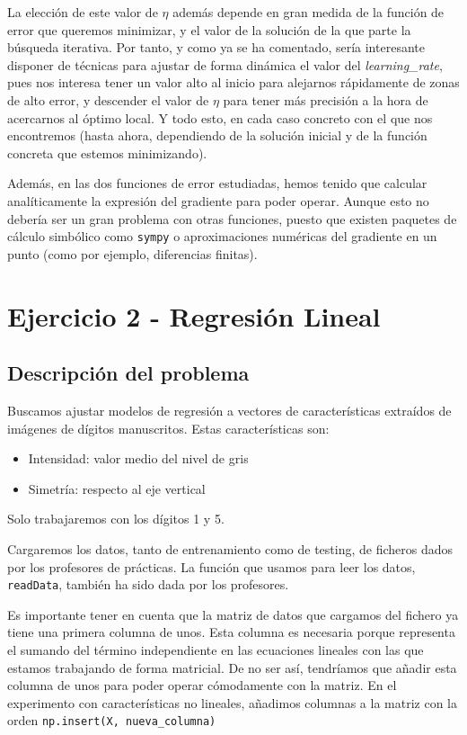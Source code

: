 \documentclass[11pt]{article}
\begin{document}
La elección de este valor de $\eta$ además depende en gran medida de la función de error que queremos minimizar, y el valor de la solución de la que parte la búsqueda iterativa. Por tanto, y como ya se ha comentado, sería interesante disponer de técnicas para ajustar de forma dinámica el valor del \emph{learning\_rate}, pues nos interesa tener un valor alto al inicio para alejarnos rápidamente de zonas de alto error, y descender el valor de $\eta$ para tener más precisión a la hora de acercarnos al óptimo local. Y todo esto, en cada caso concreto con el que nos encontremos (hasta ahora, dependiendo de la solución inicial y de la función concreta que estemos minimizando).

Además, en las dos funciones de error estudiadas, hemos tenido que calcular analíticamente la expresión del gradiente para poder operar. Aunque esto no debería ser un gran problema con otras funciones, puesto que existen paquetes de cálculo simbólico como \lstinline{sympy} o aproximaciones numéricas del gradiente en un punto (como por ejemplo, diferencias finitas).

\pagebreak

\section{Ejercicio 2 - Regresión Lineal}

\subsection{Descripción del problema}

Buscamos ajustar modelos de regresión a vectores de características extraídos de imágenes de dígitos manuscritos. Estas características son:

\begin{itemize}
    \item Intensidad: valor medio del nivel de gris
    \item Simetría: respecto al eje vertical
\end{itemize}

Solo trabajaremos con los dígitos 1 y 5.

Cargaremos los datos, tanto de entrenamiento como de testing, de ficheros dados por los profesores de prácticas. La función que usamos para leer los datos, \lstinline{readData}, también ha sido dada por los profesores.

Es importante tener en cuenta que la matriz de datos que cargamos del fichero ya tiene una primera columna de unos. Esta columna es necesaria porque representa el sumando del término independiente en las ecuaciones lineales con las que estamos trabajando de forma matricial. De no ser así, tendríamos que añadir esta columna de unos para poder operar cómodamente con la matriz. En el experimento con características no lineales, añadimos columnas a la matriz con la orden \lstinline{np.insert(X, nueva_columna)}
\end{document}
